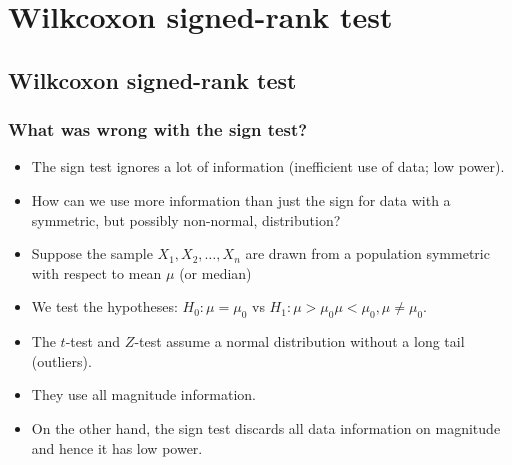 \documentclass[a4paper]{article}\usepackage[]{graphicx}\usepackage[]{xcolor}
\begin{document}
\section{Wilkcoxon signed-rank test}\label{sec:14}
\subsection{Wilkcoxon signed-rank test}
\subsubsection{What was wrong with the sign test?}
\begin{itemize}
	\item The sign test ignores a lot of information (inefficient use of data; low power).\
	\item How can we use more information than just the sign for data with a symmetric, but possibly non-normal, distribution?
	\item Suppose the sample \( X_1,X_2,\dotsc,X_n \) are drawn from a population symmetric with respect to mean \( \mu \) (or median)
	\item We test the hypotheses: \( H_0: \mu = \mu_0 \) vs \( H_1: \mu > \mu_0 \mu < \mu_0, \mu \neq \mu_0 \).
	\item The \( t \)-test and \( Z \)-test assume a normal distribution without a long tail (outliers).
	\item They use all \textcolor{mygreen}{magnitude} information.
	\item On the other hand, the sign test discards all data information on \textcolor{mygreen}{magnitude} and hence it has low power.
\end{itemize}
\end{document}
